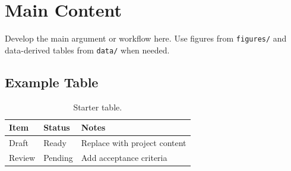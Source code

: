 \section{Main Content}

Develop the main argument or workflow here. Use figures from \texttt{figures/} and data-derived tables from \texttt{data/} when needed.

\subsection{Example Table}

\begin{table}[htbp]
  \centering
  \begin{tabular}{lll}
    \toprule
    Item & Status & Notes \\
    \midrule
    Draft & Ready & Replace with project content \\
    Review & Pending & Add acceptance criteria \\
    \bottomrule
  \end{tabular}
  \caption{Starter table.}
\end{table}
